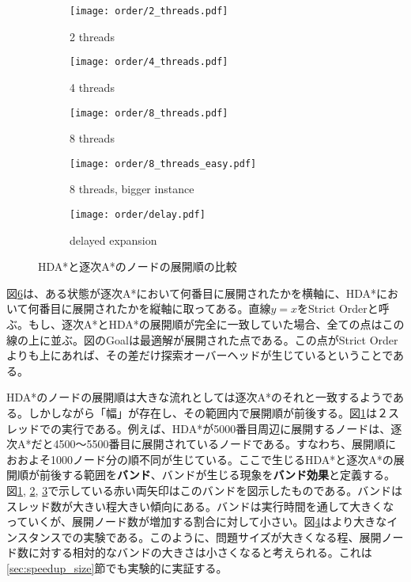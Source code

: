 \documentclass[uplatex]{jsarticle}
\begin{document}
\begin{figure}[h]
	\centering
	\begin{subfigure}{0.45\columnwidth}
		\centering
		\texttt{[image: order/2\_threads.pdf]}
		\caption{2 threads}
		\label{fig:order_2_threads}
	\end{subfigure}
	\begin{subfigure}{0.45\columnwidth}
		\centering
		\texttt{[image: order/4\_threads.pdf]}
		\caption{4 threads}
		\label{fig:order_4_threads}
	\end{subfigure}
	\begin{subfigure}{0.45\columnwidth}
		\centering
		\texttt{[image: order/8\_threads.pdf]}
		\caption{8 threads}
		\label{fig:order_8_threads}
	\end{subfigure}
	\begin{subfigure}{0.45\columnwidth}
		\centering
		\texttt{[image: order/8\_threads\_easy.pdf]}
		\caption{8 threads, bigger instance}
		\label{fig:order_8_threads_easy}
	\end{subfigure}
	\begin{subfigure}{0.45\columnwidth}
		\centering
		\texttt{[image: order/delay.pdf]}
		\caption{delayed expansion}
		\label{fig:order_delay}
	\end{subfigure}
	\caption{HDA*と逐次A*のノードの展開順の比較}
	\label{fig:hdastar_orders}
\end{figure}

図\ref{fig:hdastar_orders}は、ある状態が逐次A*において何番目に展開されたかを横軸に、HDA*において何番目に展開されたかを縦軸に取ってある。直線$y = x$をStrict Orderと呼ぶ。もし、逐次A*とHDA*の展開順が完全に一致していた場合、全ての点はこの線の上に並ぶ。図のGoalは最適解が展開された点である。この点がStrict Orderよりも上にあれば、その差だけ探索オーバーヘッドが生じているということである。

HDA*のノードの展開順は大きな流れとしては逐次A*のそれと一致するようである。しかしながら「幅」が存在し、その範囲内で展開順が前後する。図\ref{fig:order_2_threads}は２スレッドでの実行である。例えば、HDA*が5000番目周辺に展開するノードは、逐次A*だと4500〜5500番目に展開されているノードである。すなわち、展開順におおよそ1000ノード分の順不同が生じている。ここで生じるHDA*と逐次A*の展開順が前後する範囲を\textbf{バンド}、バンドが生じる現象を\textbf{バンド効果}と定義する。図\ref{fig:order_2_threads}, \ref{fig:order_4_threads}, \ref{fig:order_8_threads}で示している赤い両矢印はこのバンドを図示したものである。バンドはスレッド数が大きい程大きい傾向にある。バンドは実行時間を通して大きくなっていくが、展開ノード数が増加する割合に対して小さい。図\ref{fig:order_8_threads_easy}はより大きなインスタンスでの実験である。このように、問題サイズが大きくなる程、展開ノード数に対する相対的なバンドの大きさは小さくなると考えられる。これは\ref{sec:speedup_size}節でも実験的に実証する。
\end{document}
